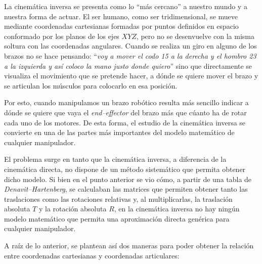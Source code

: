 La cinemática inversa se presenta como lo ``más cercano'' a nuestro mundo y a nuestra
forma de actuar. El ser humano, como ser tridimensional, se mueve mediante coordenadas
cartesianas formadas por puntos definidos en espacio conformado por los planos de los
ejes $XYZ$, pero no se desenvuelve con la misma soltura con las coordenadas angulares.
Cuando se realiza un giro en alguno de los brazos no se hace pensando: ``\textit{voy a mover el codo
    15\textdegree{} a la derecha y el hombro 23\textdegree{} a la izquierda y así coloco la
    mano justo donde quiero}'' sino que directamente se visualiza el movimiento que se pretende
hacer, a dónde se quiere mover el brazo y se articulan los músculos para
colocarlo en esa posición.

Por esto, cuando manipulamos un brazo robótico resulta más sencillo indicar a dónde
se quiere que vaya el \textit{end--effector} del brazo más que cúanto ha de rotar cada uno de los
motores. De esta forma, el estudio de la cinemática inversa se convierte en una de las
partes más importantes del modelo matemático de cualquier manipulador.

El problema surge en tanto que la cinemática inversa, a diferencia de la cinemática
directa, no dispone de un método sistemático que permita obtener dicho modelo. Si bien en el
punto anterior se vio cómo, a partir de una tabla de \textit{Denavit--Hartenberg},
se calculaban las matrices que permiten obtener tanto las traslaciones como las rotaciones
relativas y, al multiplicarlas, la traslación absoluta $T$ y la rotación absoluta $R$,
en la cinemática inversa no hay ningún modelo matemático que permita una aproximación
directa genérica para cualquier manipulador.

A raíz de lo anterior, se plantean así dos maneras para poder obtener la relación entre
coordenadas cartesianas y coordenadas articulares:

